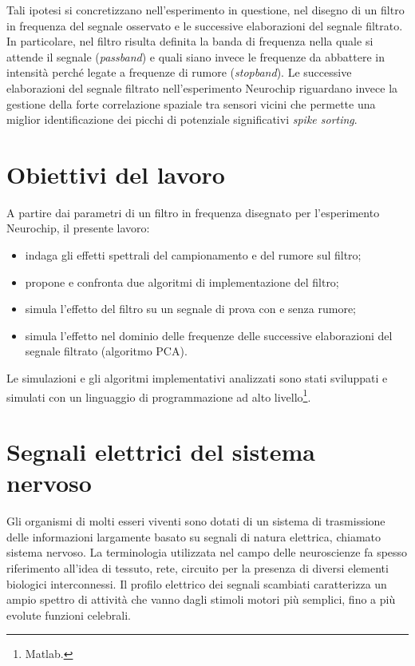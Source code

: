 Tali ipotesi si concretizzano nell'esperimento in questione, nel disegno di un filtro in frequenza del segnale osservato e le successive elaborazioni del segnale filtrato. In particolare, nel filtro risulta definita la banda di frequenza nella quale si attende il segnale ({\it passband}) e quali siano invece le frequenze da abbattere in intensità perché legate a frequenze di rumore ({\it stopband}). Le successive elaborazioni del segnale filtrato nell'esperimento Neurochip riguardano invece la gestione della forte correlazione spaziale tra sensori vicini che permette una miglior identificazione dei picchi di potenziale significativi {\it spike sorting}.



\section{Obiettivi del lavoro}
\label{sez:obiettivo}

A partire dai parametri di un filtro in frequenza disegnato per l'esperimento Neurochip, il presente lavoro:
\begin{itemize}
 \item indaga gli effetti spettrali del campionamento e del rumore sul filtro;
 \item propone e confronta due algoritmi di implementazione del filtro;
 \item simula l'effetto del filtro su un segnale di prova con e senza rumore;
 \item simula l'effetto nel dominio delle frequenze delle successive elaborazioni del segnale filtrato (algoritmo PCA).
\end{itemize}
Le simulazioni e gli algoritmi implementativi analizzati sono stati sviluppati e simulati con un linguaggio di programmazione ad alto livello\footnote{Matlab.}.


\section{Segnali elettrici del sistema nervoso}

Gli organismi di molti esseri viventi sono dotati di un sistema di trasmissione delle informazioni largamente basato su segnali di natura elettrica, chiamato sistema nervoso. La terminologia utilizzata nel campo delle neuroscienze fa spesso riferimento all'idea di tessuto, rete, circuito per la presenza di diversi elementi biologici interconnessi. Il profilo elettrico dei segnali scambiati caratterizza un ampio spettro di attività che vanno dagli stimoli motori più semplici, fino a più evolute funzioni celebrali.

